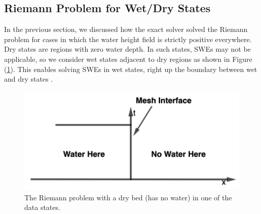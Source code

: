 \documentclass[10pt,a4paper]{article}
\newcommand{\Fig}[1]{Figure (\ref{fig:#1})}
\begin{document}
	
	\subsection{Riemann Problem for Wet/Dry States}
	
	In the previous section, we discussed how the exact solver solved the Riemann problem for cases in which the water height field is strictly positive everywhere. Dry states are regions with zero water depth. In such states, SWEs may not be applicable, so we consider wet states adjacent to dry regions as shown in  \Fig{dry-bed}. This enables solving SWEs in wet states, right up the boundary between wet and dry states  \citep{toro2001shock,ge:2008}.
	\begin{figure}[H]
		\centering
		\includegraphics[width=0.5\linewidth]{images/dd1}
		\caption{ The Riemann problem with a dry bed (has no water) in one of the data states. }
		\label{fig:dry-bed}
	\end{figure}
	
\end{document}
